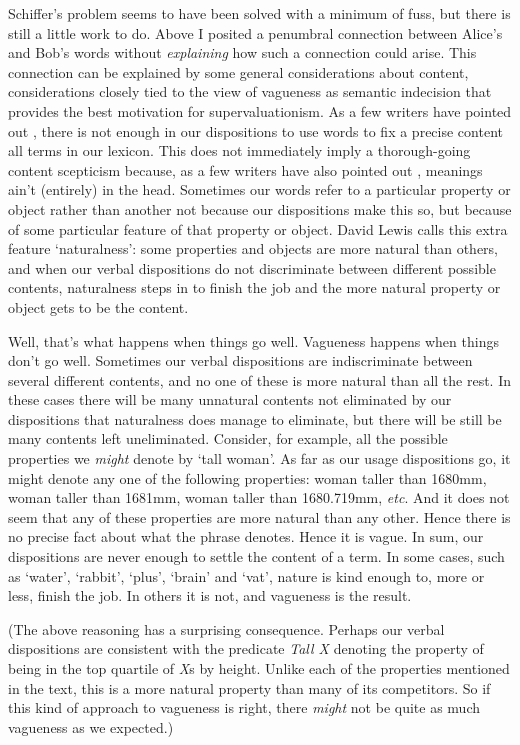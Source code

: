 Schiffer's problem seems to have been solved with a minimum of fuss, but there is still a little work to do. Above I posited a penumbral connection between Alice's and Bob's words without \textit{explaining }how such a connection could arise. This connection can be explained by some general considerations about content, considerations closely tied to the view of vagueness as semantic indecision that provides the best motivation for supervaluationism. As a few writers have pointed out \citep{Quine1960, Putnam1980, Kripke1982}, there is not enough in our dispositions to use words to fix a precise content all terms in our lexicon. This does not immediately imply a thorough-going content scepticism because, as a few writers have also pointed out \citep{Putnam1973, Kripke1980, Lewis1983e, Lewis1984a}, meanings ain't (entirely) in the head. Sometimes our words refer to a particular property or object rather than another not because our dispositions make this so, but because of some particular feature of that property or object. David Lewis calls this extra feature `naturalness': some properties and objects are more natural than others, and when our verbal dispositions do not discriminate between different possible contents, naturalness steps in to finish the job and the more natural property or object gets to be the content.

Well, that's what happens when things go well. Vagueness happens when things don't go well. Sometimes our verbal dispositions are indiscriminate between several different contents, and no one of these is more natural than all the rest. In these cases there will be many unnatural contents not eliminated by our dispositions that naturalness does manage to eliminate, but there will be still be many contents left uneliminated. Consider, for example, all the possible properties we \textit{might} denote by `tall woman'. As far as our usage dispositions go, it might denote any one of the following properties: woman taller than 1680mm, woman taller than 1681mm, woman taller than 1680.719mm, \textit{etc}. And it does not seem that any of these properties are more natural than any other. Hence there is no precise fact about what the phrase denotes. Hence it is vague. In sum, our dispositions are never enough to settle the content of a term. In some cases, such as `water', `rabbit', `plus', `brain' and `vat', nature is kind enough to, more or less, finish the job. In others it is not, and vagueness is the result.

(The above reasoning has a surprising consequence. Perhaps our verbal dispositions are consistent with the predicate \textit{Tall X} denoting the property of being in the top quartile of \textit{X}s by height. Unlike each of the properties mentioned in the text, this is a more natural property than many of its competitors. So if this kind of approach to vagueness is right, there \textit{might} not be quite as much vagueness as we expected.)

